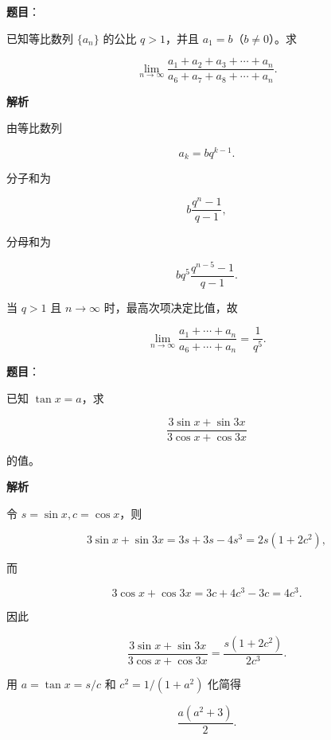 \begin{answer}

\textbf{题目}：

已知等比数列 $\{a_n\}$ 的公比 $q>1$，并且 $a_1=b$（$b\ne0$）。求

\nopagebreak[4]
\[
\lim_{n\to\infty}
\frac{a_1+a_2+a_3+\cdots+a_n}
{a_6+a_7+a_8+\cdots+a_n}.
\]

\textbf{解析}

由等比数列

\nopagebreak[4]
\[
a_k=bq^{k-1}.
\]

分子和为

\nopagebreak[4]
\[
b\frac{q^n-1}{q-1},
\]

分母和为

\nopagebreak[4]
\[
bq^5\frac{q^{n-5}-1}{q-1}.
\]

当 $q>1$ 且 $n\to\infty$ 时，最高次项决定比值，故

\nopagebreak[4]
\[
\lim_{n\to\infty}
\frac{a_1+\cdots+a_n}{a_6+\cdots+a_n}
=\frac1{q^5}.
\]


\end{answer}
\begin{answer}

\textbf{题目}：

已知 $\tan x=a$，求

\nopagebreak[4]
\[
\frac{3\sin x+\sin3x}{3\cos x+\cos3x}
\]

的值。

\textbf{解析}

令 $s=\sin x,c=\cos x$，则

\nopagebreak[4]
\[
3\sin x+\sin3x
=3s+3s-4s^3
=2s(1+2c^2),
\]

而

\nopagebreak[4]
\[
3\cos x+\cos3x
=3c+4c^3-3c=4c^3.
\]

因此

\nopagebreak[4]
\[
\frac{3\sin x+\sin3x}{3\cos x+\cos3x}
=\frac{s(1+2c^2)}{2c^3}.
\]

用 $a=\tan x=s/c$ 和 $c^2=1/(1+a^2)$ 化简得

\nopagebreak[4]
\[
\frac{a(a^2+3)}2.
\]


\end{answer}
